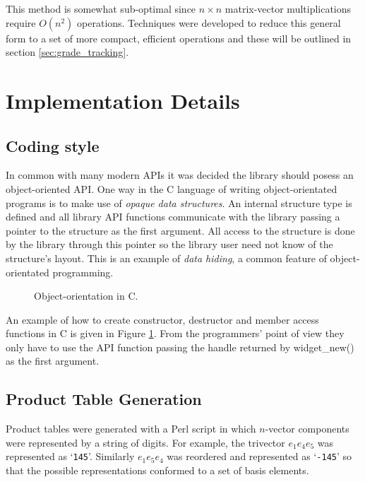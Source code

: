 This method is somewhat sub-optimal since $n \times n$ matrix-vector
multiplications require $O(n^2)$ operations. Techniques were developed to
reduce this general form to a set of more compact, efficient operations and
these will be outlined in section \ref{sec:grade_tracking}.


\section{Implementation Details}

\subsection{Coding style}

In common with many modern APIs it was decided the library should posess
an object-oriented API. One
way in the C language of writing object-orientated programs is to make
use of \emph{opaque data structures}. An internal structure type is defined
and all library API functions communicate with the library passing a 
pointer to the structure as the first argument. All access to the
structure is done by the library through this pointer so the library
user need not know of the structure's layout. This is an example
of \emph{data hiding}, a common feature of object-orientated programming.

\begin{figure}
\centering
\begin{minipage}{8cm}

\end{minipage}
\caption{Object-orientation in C.\label{fig:oopc}}
\end{figure}

An example of how to create constructor, destructor and member access 
functions in C is given in Figure \ref{fig:oopc}. From the programmers'
point of view they only have to use the API function passing the handle returned
by \textsf{widget\_new()} as the first argument.

\subsection{Product Table Generation}

Product tables were generated with a Perl
script in which $n$-vector components were represented
by a string of digits. For example, the trivector $e_1e_4e_5$ was represented as
`{\tt 145}'. Similarly $e_1e_5e_4$ was reordered and
represented as `{\tt -145}' so that the 
possible representations conformed to a set of basis elements.

